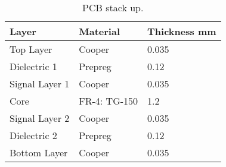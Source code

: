 \newpage

\begin{table}[!h]
    \centering
    \begin{tabular}{L{0.3\columnwidth}L{0.3\columnwidth}L{0.3\columnwidth}}
        \toprule[1.5pt]
        \textbf{Layer}  & \textbf{Material}   & \textbf{Thickness mm} \\
        \midrule
        Top Layer       & Cooper              & 0.035                   \\
        Dielectric 1    & Prepreg             & 0.12                    \\
        Signal Layer 1  & Cooper              & 0.035                   \\
        Core            & FR-4: TG-150         & 1.2                     \\
        Signal Layer 2  & Cooper              & 0.035                   \\
        Dielectric 2    & Prepreg             & 0.12                    \\
        Bottom Layer    & Cooper              & 0.035                   \\
        \bottomrule[1.5pt]
    \end{tabular}
    \caption{PCB stack up.}
    \label{tab:pcb-stackup}
\end{table}
